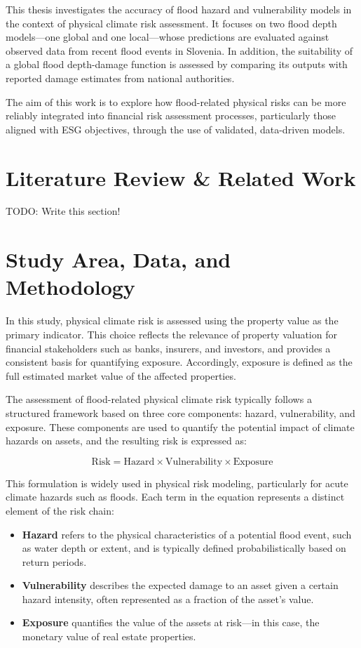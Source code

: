 \documentclass[a4paper,10.80pt,twoside]{article}
\begin{document}
This thesis investigates the accuracy of flood hazard and vulnerability models in the context of physical climate risk assessment. It focuses on two flood depth models—one global and one local—whose predictions are evaluated against observed data from recent flood events in Slovenia. In addition, the suitability of a global flood depth-damage function is assessed by comparing its outputs with reported damage estimates from national authorities.

The aim of this work is to explore how flood-related physical risks can be more reliably integrated into financial risk assessment processes, particularly those aligned with ESG objectives, through the use of validated, data-driven models.

\section{Literature Review \& Related Work}
TODO: Write this section!

\section{Study Area, Data, and Methodology}

In this study, physical climate risk is assessed using the property value as the primary indicator. This choice reflects the relevance of property valuation for financial stakeholders such as banks, insurers, and investors, and provides a consistent basis for quantifying exposure. Accordingly, exposure is defined as the full estimated market value of the affected properties.

The assessment of flood-related physical climate risk typically follows a structured framework based on three core components: hazard, vulnerability, and exposure. These components are used to quantify the potential impact of climate hazards on assets, and the resulting risk is expressed as:

\begin{equation}
\mathrm{Risk} = \mathrm{Hazard} \times \mathrm{Vulnerability} \times \mathrm{Exposure}
\end{equation}

This formulation is widely used in physical risk modeling, particularly for acute climate hazards such as floods. Each term in the equation represents a distinct element of the risk chain:

\begin{itemize}
  \item \textbf{Hazard} refers to the physical characteristics of a potential flood event, such as water depth or extent, and is typically defined probabilistically based on return periods.
  \item \textbf{Vulnerability} describes the expected damage to an asset given a certain hazard intensity, often represented as a fraction of the asset's value.
  \item \textbf{Exposure} quantifies the value of the assets at risk—in this case, the monetary value of real estate properties.
\end{itemize}
\end{document}
